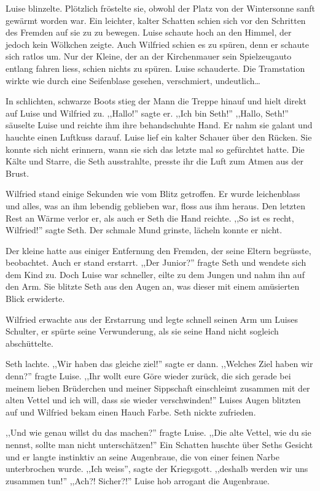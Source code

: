 Luise blinzelte. Plötzlich fröstelte sie, obwohl der Platz von der Wintersonne sanft gewärmt worden war. Ein leichter, kalter Schatten schien sich vor den Schritten des Fremden auf sie zu zu bewegen. Luise schaute hoch an den Himmel, der jedoch kein Wölkchen zeigte. Auch Wilfried schien es zu spüren, denn er schaute sich ratlos um. Nur der Kleine, der an der Kirchenmauer sein Spielzeugauto entlang fahren liess, schien nichts zu spüren. Luise schauderte. Die Tramstation wirkte wie durch eine Seifenblase gesehen, verschmiert, undeutlich\dots

In schlichten, schwarze Boots stieg der Mann die Treppe hinauf und hielt direkt auf Luise und Wilfried zu. ,,Hallo!'' sagte er. ,,Ich bin Seth!'' ,,Hallo, Seth!'' säuselte Luise und reichte ihm ihre behandschuhte Hand. Er nahm sie galant und hauchte einen Luftkuss darauf. Luise lief ein kalter Schauer über den Rücken. Sie konnte sich nicht erinnern, wann sie sich das letzte mal so gefürchtet hatte. Die Kälte und Starre, die Seth ausstrahlte, presste ihr die Luft zum Atmen aus der Brust.

Wilfried stand einige Sekunden wie vom Blitz getroffen. Er wurde leichenblass und alles, was an ihm lebendig geblieben war, floss aus ihm heraus. Den letzten Rest an Wärme verlor er, als auch er Seth die Hand reichte. ,,So ist es recht, Wilfried!'' sagte Seth. Der schmale Mund grinste, lächeln konnte er nicht.

Der kleine hatte aus einiger Entfernung den Fremden, der seine Eltern begrüsste, beobachtet. Auch er stand erstarrt. ,,Der Junior?'' fragte Seth und wendete sich dem Kind zu. Doch Luise war schneller, eilte zu dem Jungen und nahm ihn auf den Arm. Sie blitzte Seth aus den Augen an, was dieser mit einem amüsierten Blick erwiderte.

Wilfried erwachte aus der Erstarrung und legte schnell seinen Arm um Luises Schulter, er spürte seine Verwunderung, als sie seine Hand nicht sogleich abschüttelte.

Seth lachte. ,,Wir haben das gleiche ziel!'' sagte er dann. ,,Welches Ziel haben wir denn?'' fragte Luise. ,,Ihr wollt eure Göre wieder zurück, die sich gerade bei meinem lieben Brüderchen und meiner Sippschaft einschleimt zusammen mit der alten Vettel und ich will, dass sie wieder verschwinden!'' Luises Augen blitzten auf und Wilfried bekam einen Hauch Farbe. Seth nickte zufrieden.

,,Und wie genau willst du das machen?'' fragte Luise. ,,Die alte Vettel, wie du sie nennst, sollte man nicht unterschätzen!'' Ein Schatten huschte über Seths Gesicht und er langte instinktiv an seine Augenbraue, die von einer feinen Narbe unterbrochen wurde. ,,Ich weiss'', sagte der Kriegsgott. ,,deshalb werden wir uns zusammen tun!'' ,,Ach?! Sicher?!'' Luise hob arrogant die Augenbraue. 

